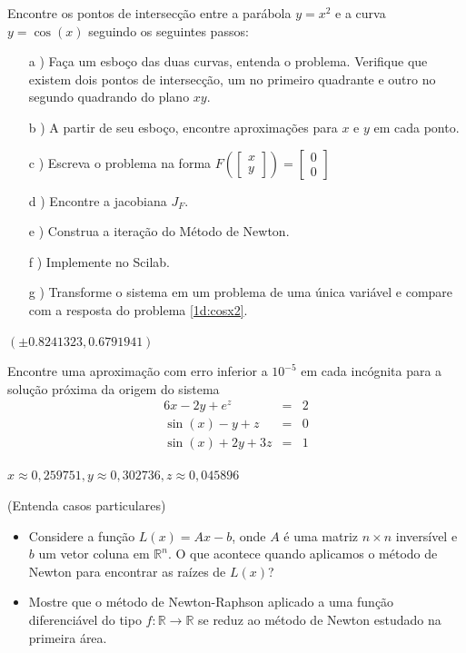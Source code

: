 \begin{exer} Encontre os pontos de intersecção entre a parábola $y=x^2$ e a curva $y=\cos(x)$ seguindo os seguintes passos:
\begin{itemize}
\item[a]) Faça um esboço das duas curvas, entenda o problema. Verifique que existem dois pontos de intersecção, um no primeiro quadrante e outro no segundo quadrando do plano $xy$.
\item[b]) A partir de seu esboço, encontre aproximações para $x$ e $y$ em cada ponto.
\item[c]) Escreva o problema na forma $F\left(\left[\begin{array}{c}x\\y\end{array}\right]\right)=\left[\begin{array}{c}0\\0\end{array}\right]$
\item[d]) Encontre a jacobiana $J_F$.
\item[e]) Construa a iteração do Método de Newton.
\item[f]) Implemente no Scilab.
\item[g]) Transforme o sistema em um problema de uma única variável e compare com a resposta do problema \ref{1d:cosx2}.
\end{itemize}
\end{exer}

\begin{resp}
 $\left(\pm 0.8241323, 0.6791941\right)$
\end{resp}

\begin{exer} Encontre uma aproximação com erro inferior a $10^{-5}$ em cada incógnita para a solução próxima da origem do sistema
\begin{eqnarray*}
6x-2y+e^{z}&=&2\\
\sin(x)-y+z&=&0\\
\sin(x)+2y+3z&=&1
\end{eqnarray*}
\end{exer}
\begin{resp}
$x\approx 0,259751, y\approx  0,302736, z\approx  0,045896$
\end{resp}



\begin{exer}(Entenda casos particulares)
\begin{itemize}
\item Considere a função $L(x)=Ax-b$, onde $A$ é uma matriz $n\times n$ inversível e $b$ um vetor coluna em $\mathbb{R}^n$. O que acontece quando aplicamos o método de Newton para encontrar as raízes de $L(x)$?
\item Mostre que o método de Newton-Raphson aplicado a uma função diferenciável do tipo $f:\mathbb{R}\to\mathbb{R}$ se reduz ao método de Newton estudado na primeira área.
\end{itemize}

\end{exer}


